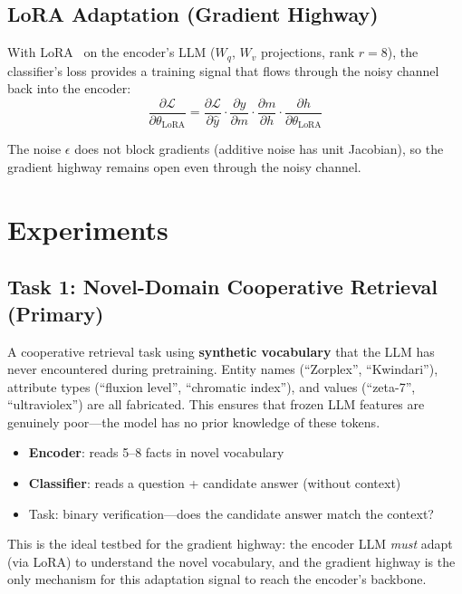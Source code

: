 \documentclass[11pt,a4paper]{article}
\begin{document}
\subsection{LoRA Adaptation (Gradient Highway)}

With LoRA~\cite{hu2022lora} on the encoder's LLM ($W_q$, $W_v$ projections, rank $r{=}8$), the classifier's loss provides a training signal that flows through the noisy channel back into the encoder:
\begin{equation}
    \frac{\partial \mathcal{L}}{\partial \theta_{\mathrm{LoRA}}}
    = \frac{\partial \mathcal{L}}{\partial \hat{y}}
      \cdot \frac{\partial \hat{y}}{\partial m}
      \cdot \frac{\partial m}{\partial h}
      \cdot \frac{\partial h}{\partial \theta_{\mathrm{LoRA}}}
\end{equation}

The noise $\epsilon$ does not block gradients (additive noise has unit Jacobian), so the gradient highway remains open even through the noisy channel.

\section{Experiments}

\subsection{Task 1: Novel-Domain Cooperative Retrieval (Primary)}

A cooperative retrieval task using \textbf{synthetic vocabulary} that the LLM has never encountered during pretraining. Entity names (``Zorplex'', ``Kwindari''), attribute types (``fluxion level'', ``chromatic index''), and values (``zeta-7'', ``ultraviolex'') are all fabricated. This ensures that frozen LLM features are genuinely poor---the model has no prior knowledge of these tokens.

\begin{itemize}[nosep]
    \item \textbf{Encoder}: reads 5--8 facts in novel vocabulary
    \item \textbf{Classifier}: reads a question + candidate answer (without context)
    \item Task: binary verification---does the candidate answer match the context?
\end{itemize}

This is the ideal testbed for the gradient highway: the encoder LLM \emph{must} adapt (via LoRA) to understand the novel vocabulary, and the gradient highway is the only mechanism for this adaptation signal to reach the encoder's backbone.
\end{document}
